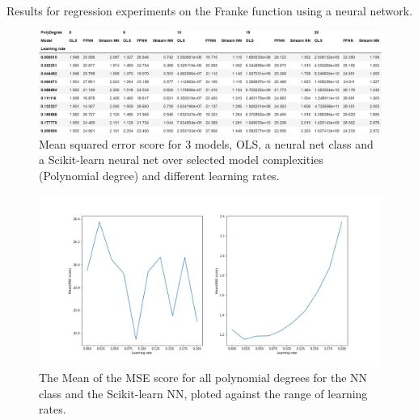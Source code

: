 \documentclass[reprint,english,notitlepage]{revtex4-2}  %
\begin{document}
Results for regression experiments on the Franke function using a neural network. 

\begin{figure}[!htb]
	\centering\includegraphics[trim=75 20 100 0, scale=0.30]{Partb-1}
	\caption{Mean squared error score for 3 models, OLS, a neural net class and a Scikit-learn neural net over selected model complexities (Polynomial degree) and different learning rates.  }\label{figure}
\end{figure}
\begin{figure}[!htb]
	\centering\includegraphics[trim=75 20 0 0, scale=0.25]{Partb-2}
	\caption{The Mean of the MSE score for all polynomial degrees for the NN class and the Scikit-learn NN, ploted against the range of learning rates.}\label{figure}
\end{figure}
\end{document}
